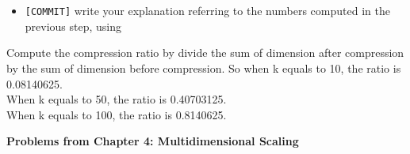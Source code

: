\documentclass[12pt]{article}
\begin{document}
\begin{itemize}
\begin{itemize}
            \item \verb+[COMMIT]+ write your explanation referring to the
                numbers computed in the previous step, using
                \verb++
        \end{itemize}
Compute the compression ratio by divide the sum of dimension after compression by the sum of dimension before compression.
So when k equals to 10, the ratio is 0.08140625.\\
When k equals to 50, the ratio is 0.40703125.\\
When k equals to 100, the ratio is 0.8140625.\\
\end{itemize}

\vskip0.25in
\begin{center}
    \textbf{Problems from Chapter 4: Multidimensional Scaling}
\end{center}
\end{document}
